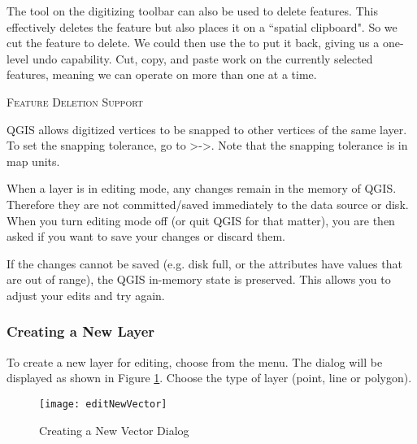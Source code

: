 The  tool on the digitizing toolbar can
also be used to delete features. This effectively deletes the feature but
also places it on a ``spatial clipboard". So we cut the feature to delete. 
We could then use the  to put it back, giving us a one-level undo 
capability. Cut, copy, and paste work on the currently selected features, 
meaning we can operate on more than one at a time.

\begin{Tip}[ht]\caption{\textsc{Feature Deletion Support}}
\end{Tip}

QGIS allows digitized vertices to be snapped to other vertices of the same layer. To 
set the snapping tolerance, go to
>->.
Note that the snapping tolerance is in map units.


When a layer is in editing mode, any changes remain in the memory of QGIS.
Therefore they are not committed/saved immediately to the data source or disk.
When you turn editing mode off (or quit QGIS for that matter), 
you are then asked if you want to save your
changes or discard them.

If the changes cannot be saved (e.g. disk full, or the attributes have
values that are out of range), the QGIS in-memory state is preserved.  This
allows you to adjust your edits and try again.

\subsubsection{Creating a New Layer}\label{sec:create shape}

To create a new layer for editing, choose  from the
 menu. 
The  dialog will be displayed as
shown in Figure \ref{fig:newvectorlayer}. Choose the type of layer (point,
line or polygon).

\begin{figure}[ht]
   \begin{center}
   \caption{Creating a New Vector Dialog \nixcaption}\label{fig:newvectorlayer}\smallskip
   \texttt{[image: editNewVector]}
\end{center} 
\end{figure}

